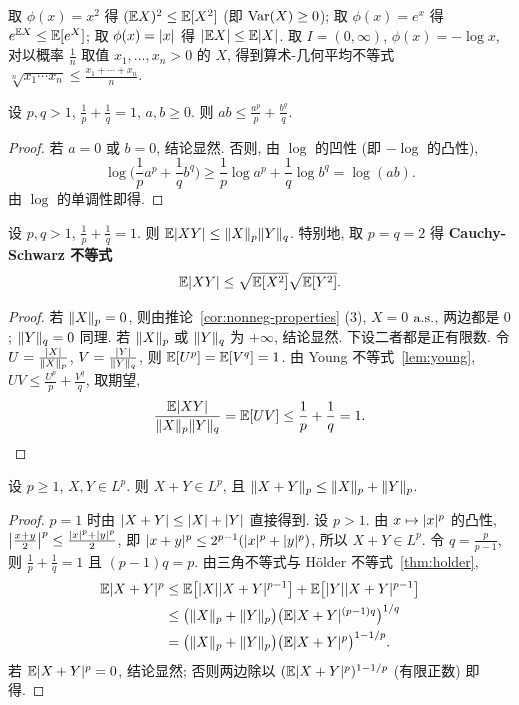 \begin{example}\label{ex:jensen}
取 $\phi(x)=x^2$ 得 $(\mathbb{E} X)^2\le\mathbb{E}[X^2]$ (即 $\operatorname{Var}(X)\ge0$); 取 $\phi(x)=e^x$ 得 $e^{\mathbb{E} X}\le\mathbb{E}[e^X]$; 取 $\phi(x)=\lvert x\rvert$ 得 $\lvert\mathbb{E} X\rvert\le\mathbb{E}\lvert X\rvert$. 取 $I=(0,\infty)$, $\phi(x)=-\log x$, 对以概率 $\frac{1}{n}$ 取值 $x_1,\dots,x_n>0$ 的 $X$, 得到算术-几何平均不等式 $\sqrt[n]{x_1\cdots x_n}\le\frac{x_1+\cdots+x_n}{n}$.
\end{example}

\begin{lemma}\label{lem:young}
设 $p,q>1$, $\frac{1}{p}+\frac{1}{q}=1$, $a,b\ge0$. 则 $ab\le\frac{a^p}{p}+\frac{b^q}{q}$.
\end{lemma}

\begin{proof}
若 $a=0$ 或 $b=0$, 结论显然. 否则, 由 $\log$ 的凹性 (即 $-\log$ 的凸性),
\[
\log\Big(\frac{1}{p}a^p+\frac{1}{q}b^q\Big)\ge\frac{1}{p}\log a^p+\frac{1}{q}\log b^q=\log(ab).
\]
由 $\log$ 的单调性即得.
\end{proof}

\begin{theorem}\label{thm:holder}
设 $p,q>1$, $\frac{1}{p}+\frac{1}{q}=1$. 则 $\mathbb{E}\lvert XY\rvert\le\lVert X\rVert_p\lVert Y\rVert_q$. 特别地, 取 $p=q=2$ 得 \textbf{Cauchy-Schwarz 不等式}
\[
\mathbb{E}\lvert XY\rvert\le\sqrt{\mathbb{E}[X^2]}\sqrt{\mathbb{E}[Y^2]}.
\]
\end{theorem}

\begin{proof}
若 $\lVert X\rVert_p=0$, 则由推论~\ref{cor:nonneg-properties} (3), $X=0$ $\text{a.s.}$, 两边都是 $0$; $\lVert Y\rVert_q=0$ 同理. 若 $\lVert X\rVert_p$ 或 $\lVert Y\rVert_q$ 为 $+\infty$, 结论显然. 下设二者都是正有限数. 令 $U=\frac{\lvert X\rvert}{\lVert X\rVert_p}$, $V=\frac{\lvert Y\rvert}{\lVert Y\rVert_q}$, 则 $\mathbb{E}[U^p]=\mathbb{E}[V^q]=1$. 由 Young 不等式~\ref{lem:young}, $UV\le\frac{U^p}{p}+\frac{V^q}{q}$, 取期望,
\[
\frac{\mathbb{E}\lvert XY\rvert}{\lVert X\rVert_p\lVert Y\rVert_q}=\mathbb{E}[UV]\le\frac{1}{p}+\frac{1}{q}=1.\qedhere
\]
\end{proof}

\begin{theorem}\label{thm:minkowski}
设 $p\ge1$, $X,Y\in L^p$. 则 $X+Y\in L^p$, 且 $\lVert X+Y\rVert_p\le\lVert X\rVert_p+\lVert Y\rVert_p$.
\end{theorem}

\begin{proof}
$p=1$ 时由 $\lvert X+Y\rvert\le\lvert X\rvert+\lvert Y\rvert$ 直接得到. 设 $p>1$. 由 $x\mapsto\lvert x\rvert^p$ 的凸性, $\big|\frac{x+y}{2}\big|^p\le\frac{\lvert x\rvert^p+\lvert y\rvert^p}{2}$, 即 $\lvert x+y\rvert^p\le2^{p-1}(\lvert x\rvert^p+\lvert y\rvert^p)$, 所以 $X+Y\in L^p$. 令 $q=\frac{p}{p-1}$, 则 $\frac{1}{p}+\frac{1}{q}=1$ 且 $(p-1)q=p$. 由三角不等式与 H\"older 不等式~\ref{thm:holder},
\begin{align*}
\mathbb{E}\lvert X+Y\rvert^p&\le\mathbb{E}\big[\lvert X\rvert\lvert X+Y\rvert^{p-1}\big]+\mathbb{E}\big[\lvert Y\rvert\lvert X+Y\rvert^{p-1}\big]\\
&\le\big(\lVert X\rVert_p+\lVert Y\rVert_p\big)\big(\mathbb{E}\lvert X+Y\rvert^{(p-1)q}\big)^{1/q}\\
&=\big(\lVert X\rVert_p+\lVert Y\rVert_p\big)\big(\mathbb{E}\lvert X+Y\rvert^p\big)^{1-1/p}.
\end{align*}
若 $\mathbb{E}\lvert X+Y\rvert^p=0$, 结论显然; 否则两边除以 $(\mathbb{E}\lvert X+Y\rvert^p)^{1-1/p}$ (有限正数) 即得.
\end{proof}

